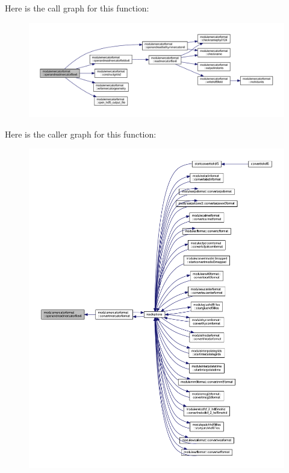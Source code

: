 Here is the call graph for this function\+:\nopagebreak
\begin{figure}[H]
\begin{center}
\leavevmode
\includegraphics[width=350pt]{namespacemodulemercatorformat_ab8e00c6758579bd5d8a955326cb3d6d1_cgraph}
\end{center}
\end{figure}
Here is the caller graph for this function\+:\nopagebreak
\begin{figure}[H]
\begin{center}
\leavevmode
\includegraphics[width=350pt]{namespacemodulemercatorformat_ab8e00c6758579bd5d8a955326cb3d6d1_icgraph}
\end{center}
\end{figure}
\mbox{\label{namespacemodulemercatorformat_a9ef4ded8a79fc7dae92a2f3410aa9ab4}} 
